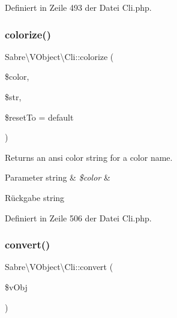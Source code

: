 Definiert in Zeile 493 der Datei Cli.\+php.

\mbox{\label{class_sabre_1_1_v_object_1_1_cli_a4e3849c3103aaeae3c51fd692dc718b4}} 
\subsubsection{\texorpdfstring{colorize()}{colorize()}}
{\footnotesize\ttfamily Sabre\textbackslash{}\+V\+Object\textbackslash{}\+Cli\+::colorize (\begin{DoxyParamCaption}\item[{}]{\$color,  }\item[{}]{\$str,  }\item[{}]{\$reset\+To = {\ttfamily \textquotesingle{}default\textquotesingle{}} }\end{DoxyParamCaption})\hspace{0.3cm}{\ttfamily [protected]}}

Returns an ansi color string for a color name.


\begin{DoxyParams}[1]{Parameter}
string & {\em \$color} & \\
\hline
\end{DoxyParams}
\begin{DoxyReturn}{Rückgabe}
string 
\end{DoxyReturn}


Definiert in Zeile 506 der Datei Cli.\+php.

\mbox{\label{class_sabre_1_1_v_object_1_1_cli_a9f85891dab426619be611a6c424ef7f5}} 
\subsubsection{\texorpdfstring{convert()}{convert()}}
{\footnotesize\ttfamily Sabre\textbackslash{}\+V\+Object\textbackslash{}\+Cli\+::convert (\begin{DoxyParamCaption}\item[{}]{\$v\+Obj }\end{DoxyParamCaption})\hspace{0.3cm}{\ttfamily [protected]}}

